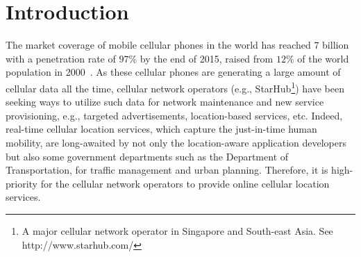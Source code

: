 \documentclass{vldb}
\begin{document}
	\vspace{-10pt}
	
	\section{Introduction}
	
	
	The market coverage of mobile cellular phones in the world has reached $7$ billion with a penetration rate of $97\%$ by the end of 2015, raised from $12\%$ of the world population in 2000~\cite{itu-int}. 
	As these cellular phones are generating a large amount of cellular data all the time,
	cellular network operators (e.g., StarHub\footnote{A major cellular network operator in Singapore and South-east Asia. See http://www.starhub.com/}) have been seeking ways to utilize such data
	for network maintenance and new service provisioning, e.g., targeted advertisements, location-based services, etc. %
	Indeed, real-time cellular location services,
	which capture the just-in-time human mobility, 
	are long-awaited by not only the location-aware application developers but also some government departments such as the Department of Transportation, %
	for traffic management and urban planning.
	Therefore, it is high-priority for the cellular network operators to provide online cellular location services.
	
	
\end{document}
